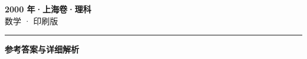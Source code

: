 \documentclass[zihao=5, a4paper]{ctexart}
\begin{document}
\begin{center}
  {\Large\bfseries 2000 年·上海卷·理科}\\[4pt]
  {\large 数学 · 印刷版}
\end{center}
\medskip
{}

\par\bigskip\hrule\bigskip
{}
\begin{center}{\large\bfseries 参考答案与详细解析}\end{center}
\smallskip

\end{document}
